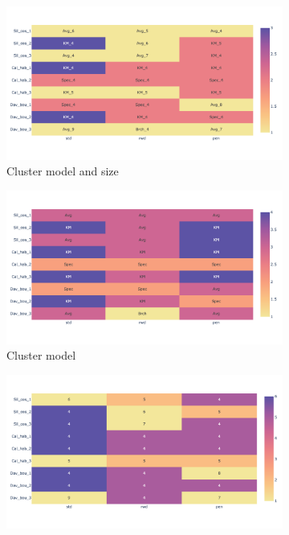 \begin{figure}[!htb]
    \centering
    \begin{subfigure}[b]{0.49\textwidth}
        \centering
        \includegraphics[width=\textwidth,keepaspectratio]{Sections/Network_I/Resources/P0/top3_cs_gen_p0_tum4K.png}    
        \caption{Cluster model and size}
    \end{subfigure}
    \hfill
    \begin{subfigure}[b]{0.49\textwidth}
        \centering
        \includegraphics[width=\textwidth,keepaspectratio]{Sections/Network_I/Resources/P0/top3_cs_model_p0_tum4K.png}
        \caption{Cluster model}
    \end{subfigure} %
    \hfill
    \begin{subfigure}[b]{0.49\textwidth}
        \centering
        \includegraphics[width=\textwidth,keepaspectratio]{Sections/Network_I/Resources/P0/top3_cs_size_p0_tum4K.png}

\end{subfigure}
\end{figure}
